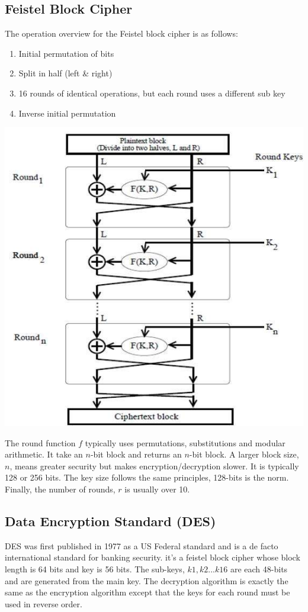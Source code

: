 \documentclass{article}
\begin{document}
\subsection{Feistel Block Cipher}
The operation overview for the Feistel block cipher is as follows:
\begin{enumerate}
	\item Initial permutation of bits
	\item Split in half (left \& right)
	\item 16 rounds of identical operations, but each round uses a different sub key
	\item Inverse initial permutation
\end{enumerate}
\begin{center}
	\includegraphics[scale=0.6]{feistel_structure.jpg}
\end{center}
The round function $f$ typically uses permutations, substitutions and modular arithmetic. It take an $n$-bit block and returns an $n$-bit block. A larger block size, $n$, means greater security but makes encryption/decryption slower. It is typically 128 or 256 bits. The key size follows the same principles, 128-bits is the norm. Finally, the number of rounds, $r$ is usually over 10.

\subsection{Data Encryption Standard (DES)}
DES was first published in 1977 as a US Federal standard and is a de facto international standard for banking security. it's a feistel block cipher whose block length is 64 bits and key is 56 bits. The sub-keys, $k1, k2...k16$ are each 48-bits and are generated from the main key. The decryption algorithm is exactly the same as the encryption algorithm except that the keys for each round must be used in reverse order.
\end{document}
